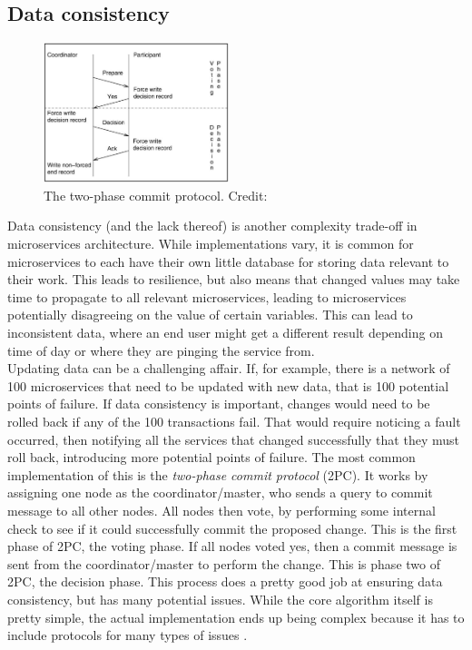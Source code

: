 \subsection{Data consistency}
\begin{figure}
\centering
\includegraphics[width=0.48\textwidth]{Figures/two_phase_commit.png}
\caption{The two-phase commit protocol. Credit: \cite*{Samaras2009}}
\label{2PC}
\end{figure}
Data consistency (and the lack thereof) is another complexity trade-off in microservices architecture.
While implementations vary, it is common for microservices to each have their own little database for storing data relevant to their work.
This leads to resilience, but also means that changed values may take time to propagate to all relevant microservices, leading to microservices potentially disagreeing on the value of certain variables.
This can lead to inconsistent data, where an end user might get a different result depending on time of day or where they are pinging the service from.\\
Updating data can be a challenging affair. If, for example, there is a network of 100 microservices that need to be updated with new data, that is 100 potential points of failure.
If data consistency is important, changes would need to be rolled back if any of the 100 transactions fail. 
That would require noticing a fault occurred, then notifying all the services that changed successfully that they must roll back, introducing more potential points of failure.
The most common implementation of this is the \textit{two-phase commit protocol} (2PC). 
It works by assigning one node as the coordinator/master, who sends a query to commit message to all other nodes.
All nodes then vote, by performing some internal check to see if it could successfully commit the proposed change.
This is the first phase of 2PC, the voting phase.
If all nodes voted yes, then a commit message is sent from the coordinator/master to perform the change.
This is phase two of 2PC, the decision phase.
This process does a pretty good job at ensuring data consistency, but has many potential issues.
While the core algorithm itself is pretty simple, the actual implementation ends up being complex because it has to include protocols for many types of issues \cite*{Samaras2009}.    


